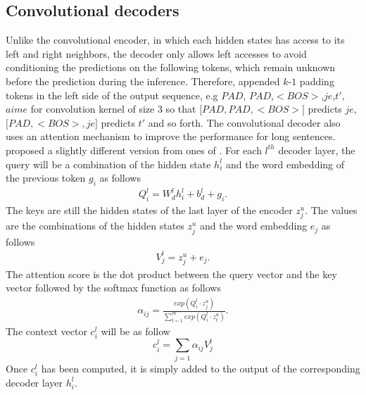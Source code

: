 \subsection{Convolutional decoders}
Unlike the convolutional encoder, in which each hidden states has access to its left and right neighbors, the decoder only allows left accesses to avoid conditioning the predictions on the following tokens, which remain unknown before the prediction during the inference. Therefore, \citet{Ghering17convolutional} appended $k\text{-}1$ padding tokens in the left side of the output sequence, e.g $PAD$, $PAD$,$ <BOS>$,$je$,$t'$,$aime$ for convolution kernel of size 3 so that $\big[ PAD, PAD, <BOS>\big]$ predicts $je$, $\big[ PAD,<BOS>,je\big]$ predicts $t'$ and so forth.
The convolutional decoder also uses an attention mechanism to improve the performance for long sentences. \citet{Ghering17convolutional} proposed a slightly different version from ones of \citet{Luong15stanford, Bahdanau15learning}. For each $l^{th}$ decoder layer, the query will be a combination of the hidden state $h^l_i$ and the word embedding of the previous token $g_i$ as follows
\begin{equation}
\begin{array}{rcl}
Q^l_i = W^l_d h^l_i + b^l_d + g_i.
\end{array}
\end{equation}
The keys are still the hidden states of the last layer of the encoder $z^u_j$. The values are the combinations of the hidden states $z^u_j$ and the word embedding $e_j$ as follows
\begin{equation}
\begin{array}{rcl}
V^l_j = z^u_j + e_j.
\end{array}
\end{equation}
The attention score is the dot product between the query vector and the key vector followed by the softmax function as follows
\begin{equation}
\begin{array}{rcl}
\alpha_{ij}=\frac{exp(Q^l_i \cdot z^u_j)}{\sum_{t=1}^m exp(Q^l_i \cdot z^u_t)}.
\end{array}
\end{equation}
The context vector $c^l_i$ will be as follow
\begin{equation}
c^l_i = \sum_{j=1}\alpha_{ij}V^l_j
\end{equation}
Once $c^l_i$ has been computed, it is simply added to the output of the corresponding decoder layer $h^l_i$.
